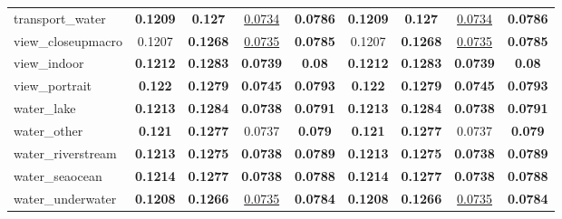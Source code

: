 \begin{center}
\begin{supertabular}{lcccc||cccc}
\small{transport\_water} & \textbf{\scriptsize{0.1209}} & \textbf{\scriptsize{0.127}} & \underline{\scriptsize{0.0734}} & \textbf{\scriptsize{0.0786}}& \textbf{\scriptsize{0.1209}} & \textbf{\scriptsize{0.127}} & \underline{\scriptsize{0.0734}} & \textbf{\scriptsize{0.0786}}\\
\small{view\_closeupmacro} & {\scriptsize{0.1207}} & \textbf{\scriptsize{0.1268}} & \underline{\scriptsize{0.0735}} & \textbf{\scriptsize{0.0785}}& {\scriptsize{0.1207}} & \textbf{\scriptsize{0.1268}} & \underline{\scriptsize{0.0735}} & \textbf{\scriptsize{0.0785}}\\
\small{view\_indoor} & \textbf{\scriptsize{0.1212}} & \textbf{\scriptsize{0.1283}} & \textbf{\scriptsize{0.0739}} & \textbf{\scriptsize{0.08}}& \textbf{\scriptsize{0.1212}} & \textbf{\scriptsize{0.1283}} & \textbf{\scriptsize{0.0739}} & \textbf{\scriptsize{0.08}}\\
\small{view\_portrait} & \textbf{\scriptsize{0.122}} & \textbf{\scriptsize{0.1279}} & \textbf{\scriptsize{0.0745}} & \textbf{\scriptsize{0.0793}}& \textbf{\scriptsize{0.122}} & \textbf{\scriptsize{0.1279}} & \textbf{\scriptsize{0.0745}} & \textbf{\scriptsize{0.0793}}\\
\small{water\_lake} & \textbf{\scriptsize{0.1213}} & \textbf{\scriptsize{0.1284}} & \textbf{\scriptsize{0.0738}} & \textbf{\scriptsize{0.0791}}& \textbf{\scriptsize{0.1213}} & \textbf{\scriptsize{0.1284}} & \textbf{\scriptsize{0.0738}} & \textbf{\scriptsize{0.0791}}\\
\small{water\_other} & \textbf{\scriptsize{0.121}} & \textbf{\scriptsize{0.1277}} & {\scriptsize{0.0737}} & \textbf{\scriptsize{0.079}}& \textbf{\scriptsize{0.121}} & \textbf{\scriptsize{0.1277}} & {\scriptsize{0.0737}} & \textbf{\scriptsize{0.079}}\\
\small{water\_riverstream} & \textbf{\scriptsize{0.1213}} & \textbf{\scriptsize{0.1275}} & \textbf{\scriptsize{0.0738}} & \textbf{\scriptsize{0.0789}}& \textbf{\scriptsize{0.1213}} & \textbf{\scriptsize{0.1275}} & \textbf{\scriptsize{0.0738}} & \textbf{\scriptsize{0.0789}}\\
\small{water\_seaocean} & \textbf{\scriptsize{0.1214}} & \textbf{\scriptsize{0.1277}} & \textbf{\scriptsize{0.0738}} & \textbf{\scriptsize{0.0788}}& \textbf{\scriptsize{0.1214}} & \textbf{\scriptsize{0.1277}} & \textbf{\scriptsize{0.0738}} & \textbf{\scriptsize{0.0788}}\\
\small{water\_underwater} & \textbf{\scriptsize{0.1208}} & \textbf{\scriptsize{0.1266}} & \underline{\scriptsize{0.0735}} & \textbf{\scriptsize{0.0784}}& \textbf{\scriptsize{0.1208}} & \textbf{\scriptsize{0.1266}} & \underline{\scriptsize{0.0735}} & \textbf{\scriptsize{0.0784}}\\

\end{supertabular}
\end{center}
